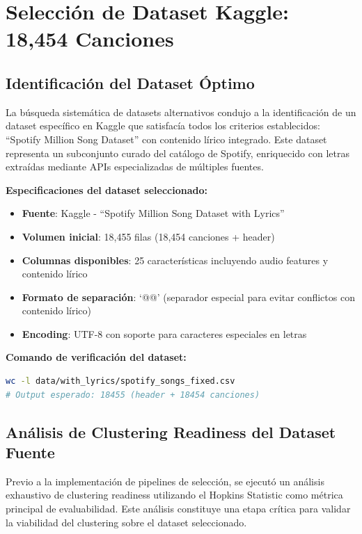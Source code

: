 \documentclass[12pt,a4paper]{article}
\begin{document}
\section{Selección de Dataset Kaggle: 18,454 Canciones}

\subsection{Identificación del Dataset Óptimo}

La búsqueda sistemática de datasets alternativos condujo a la identificación de un dataset específico en Kaggle que satisfacía todos los criterios establecidos: ``Spotify Million Song Dataset'' con contenido lírico integrado. Este dataset representa un subconjunto curado del catálogo de Spotify, enriquecido con letras extraídas mediante APIs especializadas de múltiples fuentes.

\textbf{Especificaciones del dataset seleccionado:}
\begin{itemize}[leftmargin=*]
    \item \textbf{Fuente}: Kaggle - ``Spotify Million Song Dataset with Lyrics''
    \item \textbf{Volumen inicial}: 18,455 filas (18,454 canciones + header)
    \item \textbf{Columnas disponibles}: 25 características incluyendo audio features y contenido lírico
    \item \textbf{Formato de separación}: `@@' (separador especial para evitar conflictos con contenido lírico)
    \item \textbf{Encoding}: UTF-8 con soporte para caracteres especiales en letras
\end{itemize}

\textbf{Comando de verificación del dataset:}
\begin{lstlisting}[language=bash]
wc -l data/with_lyrics/spotify_songs_fixed.csv
# Output esperado: 18455 (header + 18454 canciones)
\end{lstlisting}

\subsection{Análisis de Clustering Readiness del Dataset Fuente}

Previo a la implementación de pipelines de selección, se ejecutó un análisis exhaustivo de clustering readiness utilizando el Hopkins Statistic como métrica principal de evaluabilidad. Este análisis constituye una etapa crítica para validar la viabilidad del clustering sobre el dataset seleccionado.
\end{document}
